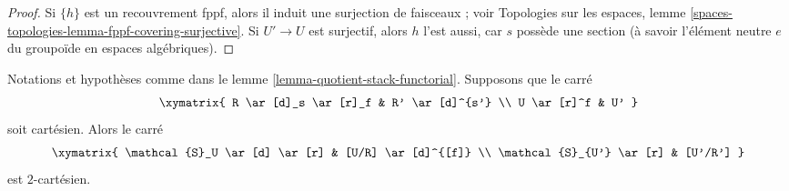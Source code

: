 \begin{proof}
\medskip\noindent
Si $\{h\}$ est un recouvrement fppf, alors il induit une surjection de
faisceaux ; voir Topologies sur les espaces, lemme
\ref{spaces-topologies-lemma-fppf-covering-surjective}. Si $U' \to U$ est
surjectif, alors $h$ l'est aussi, car $s$ possède une section (à savoir
l'élément neutre $e$ du groupoïde en espaces algébriques).
\end{proof}

\begin{lemma}
\label{lemma-criterion-fibre-product}
Notations et hypothèses comme dans le lemme
\ref{lemma-quotient-stack-functorial}. Supposons que le carré
$$
\xymatrix{
R \ar[d]_s \ar[r]_f & R' \ar[d]^{s'} \\
U \ar[r]^f & U'
}
$$
soit cartésien. Alors le carré
$$
\xymatrix{
\mathcal{S}_U \ar[d] \ar[r] & [U/R] \ar[d]^{[f]} \\
\mathcal{S}_{U'} \ar[r] & [U'/R']
}
$$
est $2$-cartésien.
\end{lemma}

